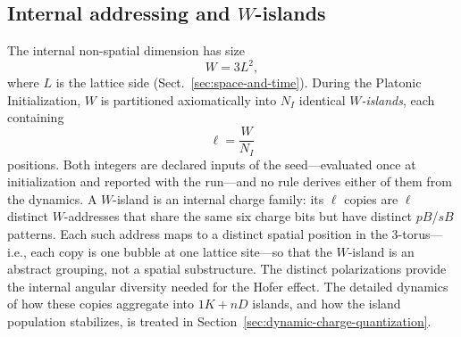 \documentclass[a4paper]{article}
\begin{document}
\subsection{Internal addressing and $W$-islands}\label{subsec:w-islands}
The internal non-spatial dimension has size
\begin{equation}
W=3L^{2},
\end{equation}
where $L$ is the lattice side (Sect.~\ref{sec:space-and-time}).
During the Platonic Initialization, $W$ is partitioned axiomatically into $N_{I}$ identical \emph{$W$-islands}, each containing
\begin{equation}
\ell=\frac{W}{N_{I}}
\end{equation}
positions.  Both integers are declared inputs of the seed---evaluated once at initialization and reported with the run---and no rule derives either of them from the dynamics.
A $W$-island is an internal charge family: its $\ell$ copies are $\ell$ distinct $W$-addresses that share the same six charge bits but have distinct $pB$/$sB$ patterns.  Each such address maps to a distinct spatial position in the 3-torus---i.e., each copy is one bubble at one lattice site---so that the $W$-island is an abstract grouping, not a spatial substructure.
The distinct polarizations provide the internal angular diversity needed for the Hofer effect.
The detailed dynamics of how these copies aggregate into $1K+nD$ islands, and how the island population stabilizes, is treated in Section~\ref{sec:dynamic-charge-quantization}.
\end{document}
